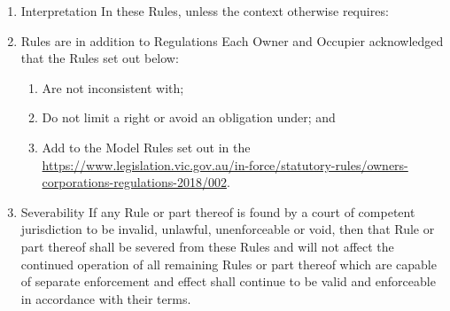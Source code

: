 \documentclass{article}
\begin{document}
\begin{enumerate}[label=\arabic*.]
\begin{enumerate}[label=\arabic{enumi}.\arabic*.]
\begin{enumerate}[label=\arabic{enumi}.\arabic*.]
\begin{enumerate}[label=(\arabic*)]
\begin{enumerate}[label=(\alph*)]
\item  All fixtures, fittings, appliances, plant and equipment, fire services, sprinkler systems or devices and all other services or systems; and

\item  Any services or systems from time to time utilised for access to the Development whether or not they are owned by the Owners Corporation.

\end{enumerate}

\item  Special Resolution has the same meaning as it has in the Act.

\item  Storage Cage means a Lot or part of the Lot that is designated or intended to be used as a storage area.

\item  Vehicle means a vehicle, including but not limited to a car, motorcycle, truck, trailer, bus, motorboat, yacht, caravan or campervan.

\item  Window Furnishings means any window coverings to any windows or glassed area of a Lot.

\end{enumerate}

\item  Interpretation In these Rules, unless the context otherwise requires:

\item  Rules are in addition to Regulations Each Owner and Occupier acknowledged that the Rules set out below:
\newpage



\begin{enumerate}[label=(\arabic*)]

\item  Are not inconsistent with;

\item  Do not limit a right or avoid an obligation under; and

\item  Add to the Model Rules set out in the \href{Owners Corporations Regulations}{https://www.legislation.vic.gov.au/in-force/statutory-rules/owners-corporations-regulations-2018/002}.

\end{enumerate}

\item  Severability If any Rule or part thereof is found by a court of competent jurisdiction to be invalid, unlawful, unenforceable or void, then that Rule or part thereof shall be severed from these Rules and will not affect the continued operation of all remaining Rules or part thereof which are capable of separate enforcement and effect shall continue to be valid and enforceable in accordance with their terms.


\end{enumerate}
\end{enumerate}
\end{enumerate}
\end{document}
